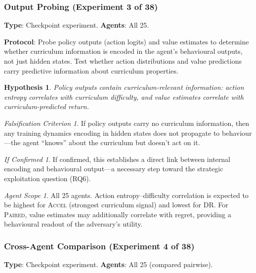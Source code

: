 \documentclass[11pt,a4paper]{article}
\newtheorem{hypothesis}{Hypothesis}[subsection]
\theoremstyle{remark}
\newtheorem*{falsification}{Falsification Criterion}
\newtheorem*{implication}{If Confirmed}
\newtheorem*{agentscope}{Agent Scope}
\newcommand{\paired}{\textsc{Paired}}
\newcommand{\accel}{\textsc{Accel}}
\newcommand{\dr}{\textsc{DR}}
\begin{document}
\subsubsection{Output Probing (Experiment 3 of 38)}
\label{exp:output_probing}

\textbf{Type}: Checkpoint experiment. \textbf{Agents}: All 25.

\textbf{Protocol}: Probe policy outputs (action logits) and value estimates to determine whether curriculum information is encoded in the agent's behavioural outputs, not just hidden states. Test whether action distributions and value predictions carry predictive information about curriculum properties.

\begin{hypothesis}
Policy outputs contain curriculum-relevant information: action entropy correlates with curriculum difficulty, and value estimates correlate with curriculum-predicted return.
\end{hypothesis}

\begin{falsification}
If policy outputs carry no curriculum information, then any training dynamics encoding in hidden states does not propagate to behaviour---the agent ``knows'' about the curriculum but doesn't act on it.
\end{falsification}

\begin{implication}
If confirmed, this establishes a direct link between internal encoding and behavioural output---a necessary step toward the strategic exploitation question (RQ6).
\end{implication}

\begin{agentscope}
All 25 agents. Action entropy--difficulty correlation is expected to be highest for \accel{} (strongest curriculum signal) and lowest for \dr{}. For \paired{}, value estimates may additionally correlate with regret, providing a behavioural readout of the adversary's utility.
\end{agentscope}

\subsubsection{Cross-Agent Comparison (Experiment 4 of 38)}
\label{exp:cross_agent_comparison}

\textbf{Type}: Checkpoint experiment. \textbf{Agents}: All 25 (compared pairwise).
\end{document}

